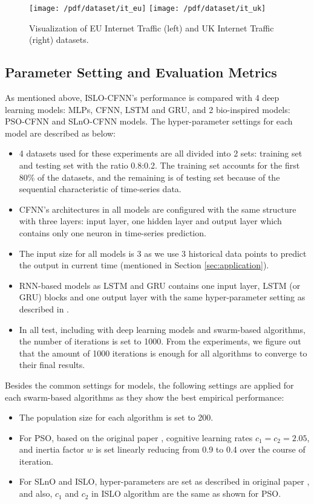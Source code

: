 \documentclass[a4paper,13pt,2p]{report}
\begin{document}
\begin{figure}[!ht] 
   \centering
   \texttt{[image: /pdf/dataset/it\_eu]}
   \texttt{[image: /pdf/dataset/it\_uk]}
  \caption{Visualization of EU Internet Traffic (left) and UK Internet Traffic (right) datasets.} 
  \label{fig_data_it} 
\end{figure}

  

\subsection{Parameter Setting and Evaluation Metrics}
	
	As mentioned above, ISLO-CFNN's performance is compared with 4 deep learning models: MLPs, CFNN, LSTM and GRU, and 2 bio-inspired models: PSO-CFNN and SLnO-CFNN models. The hyper-parameter settings for each model are described as below:
\begin{itemize}
\item 4 datasets used for these experiments are all divided into 2 sets: training set and testing set with the ratio 0.8:0.2. The training set accounts for the first 80\% of the datasets, and the remaining is of testing set because of the sequential characteristic of time-series data.
\item CFNN's architectures in all models are configured with the same structure with three layers: input layer, one hidden layer and output layer which contains only one neuron in time-series prediction.
\item The input size for all models is 3 as we use 3 historical data points to predict the output in current time (mentioned in Section \ref{sec:application}).
\item RNN-based models as LSTM and GRU contains one input layer, LSTM (or GRU) blocks and one output layer with the same hyper-parameter setting as described in \cite{fu2016using}.
\item In all test, including with deep learning models and swarm-based algorithms, the number of iterations is set to 1000. From the experiments, we figure out that the amount of 1000 iterations is enough for all algorithms to converge to their final results. 
\end{itemize} 

Besides the common settings for models, the following settings are applied for each swarm-based algorithms as they show the best empirical performance:

\begin{itemize}
\item The population size for each algorithm is set to 200.
\item For PSO, based on the original paper \cite{eberhart1995particle}, cognitive learning rates $c_1=c_2=2.05$, and inertia factor $w$ is set linearly reducing from 0.9 to 0.4 over the course of iteration.
\item For SLnO and ISLO, hyper-parameters are set as described in original paper \cite{masadeh2019sea}, and also, $c_1$ and $c_2$ in ISLO algorithm are the same as shown for PSO.
\end{itemize}
\end{document}
